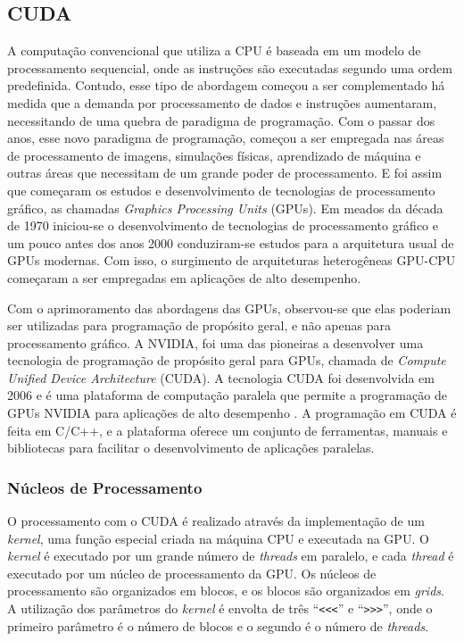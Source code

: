 \documentclass[12pt]{article}
\begin{document}
\subsection{CUDA}
A computação convencional que utiliza a CPU é baseada em um modelo de processamento sequencial, onde as instruções são executadas segundo uma ordem predefinida. Contudo, esse tipo de abordagem começou a ser complementado há medida que a demanda por processamento de dados e instruções aumentaram, necessitando de uma quebra de paradigma de programação. Com o passar dos anos, esse novo paradigma de programação, começou a ser empregada nas áreas de processamento de imagens, simulações físicas, aprendizado de máquina e outras áreas que necessitam de um grande poder de processamento. E foi assim que começaram os estudos e desenvolvimento de tecnologias de processamento gráfico, as chamadas \emph{Graphics Processing Units} (GPUs). Em meados da década de 1970 iniciou-se o desenvolvimento de tecnologias de processamento gráfico e um pouco antes dos anos 2000 conduziram-se estudos para a arquitetura usual de GPUs modernas. Com isso, o surgimento de arquiteturas heterogêneas GPU-CPU começaram a ser empregadas em aplicações de alto desempenho. \cite{cheng:2014}

Com o aprimoramento das abordagens das GPUs, observou-se que elas poderiam ser utilizadas para programação de propósito geral, e não apenas para processamento gráfico. A NVIDIA, foi uma das pioneiras a desenvolver uma tecnologia de programação de propósito geral para GPUs, chamada de \emph{Compute Unified Device Architecture} (CUDA). A tecnologia CUDA foi desenvolvida em 2006 e é uma plataforma de computação paralela que permite a programação de GPUs NVIDIA para aplicações de alto desempenho \cite{cuda:2012}. A programação em CUDA é feita em C/C++, e a plataforma oferece um conjunto de ferramentas, manuais e bibliotecas para facilitar o desenvolvimento de aplicações paralelas.

\subsubsection{Núcleos de Processamento} \label{subsubsec:cuda_cores}
O processamento com o CUDA é realizado através da implementação de um \emph{kernel}, uma função especial criada na máquina CPU e executada na GPU. O \emph{kernel} é executado por um grande número de \emph{threads} em paralelo, e cada \emph{thread} é executado por um núcleo de processamento da GPU. Os núcleos de processamento são organizados em blocos, e os blocos são organizados em \emph{grids}. A utilização dos parâmetros do \emph{kernel} é envolta de três ``\texttt{<<<}'' e ``\texttt{>>>}'', onde o primeiro parâmetro é o número de blocos e o segundo é o número de \emph{threads}.
\end{document}
